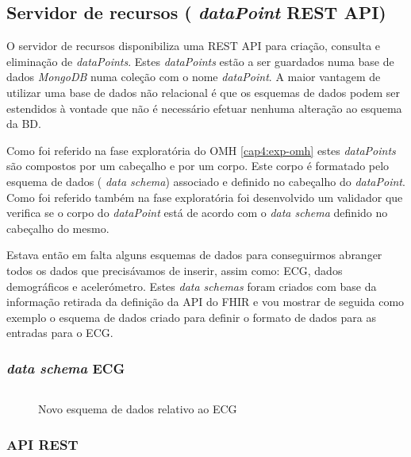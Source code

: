 \subsection{Servidor de recursos ( \textit{dataPoint} REST API) }
O servidor de recursos disponibiliza uma \gls{REST} \gls{API} para criação, consulta e eliminação de  \textit{dataPoints}. Estes  \textit{dataPoints} estão a ser guardados numa base de dados  \textit{MongoDB} numa coleção com o nome  \textit{dataPoint}. A maior vantagem de utilizar uma base de dados não relacional é que os esquemas de dados podem ser estendidos à vontade que não é necessário efetuar nenhuma alteração ao esquema da BD. \par 
Como foi referido na fase exploratória do \gls{OMH} \ref{cap4:exp-omh} estes  \textit{dataPoints} são compostos por um cabeçalho e por um corpo. Este corpo é formatado pelo esquema de dados ( \textit{data schema}) associado e definido no cabeçalho do  \textit{dataPoint}. Como foi referido também na fase exploratória foi desenvolvido um validador que verifica se o corpo do  \textit{dataPoint} está de acordo com o  \textit{data schema} definido no cabeçalho do mesmo. \par
Estava então em falta alguns esquemas de dados para conseguirmos abranger todos os dados que precisávamos de inserir, assim como: \gls{ECG}, dados demográficos e acelerómetro. Estes  \textit{data schemas} foram criados com base da informação retirada da definição da \gls{API} do \gls{FHIR} e vou mostrar de seguida como exemplo o esquema de dados criado para definir o formato de dados para as entradas para o \gls{ECG}. \newpage
\subsubsection{ \textit{data schema} ECG}
\begin{figure}[H]
\inputminted[fontsize=\scriptsize]{json}{code/ecg.json}
\caption[Novo esquema de dados relativo ao ECG]{Novo esquema de dados relativo ao ECG}
\label{f:ecgjsonschema}
\end{figure}

\subsubsection{API REST}
\label{l:restapiRESOURCES}

